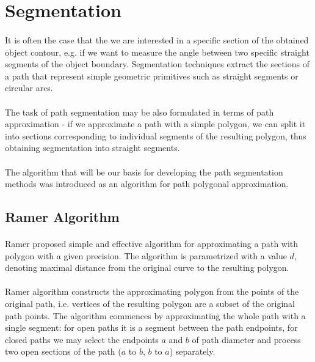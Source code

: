 \section{Segmentation}

\paragraph*{}
It is often the case that the we are interested in a specific section of the obtained object contour, e.g. if we want to measure the angle between two specific straight segments of the object boundary. Segmentation techniques extract the sections of a path that represent simple geometric primitives such as straight segments or circular arcs.

\paragraph*{}
The task of path segmentation may be also formulated in terms of path approximation - if we approximate a path with a simple polygon, we can split it into sections corresponding to individual segments of the resulting polygon, thus obtaining segmentation into straight segments.

\paragraph*{}
The algorithm that will be our basis for developing the path segmentation methods was introduced as an algorithm for path polygonal approximation.

\subsection{Ramer Algorithm}

\paragraph*{}
Ramer proposed\cite{Ramer72} simple and effective algorithm for approximating a path with polygon with a given precision. The algorithm is parametrized with a value $d$, denoting maximal distance from the original curve to the resulting polygon.

\paragraph*{}
Ramer algorithm constructs the approximating polygon from the points of the original path, i.e. vertices of the resulting polygon are a subset of the original path points. The algorithm commences by approximating the whole path with a single segment: for open paths it is a segment between the path endpoints, for closed paths we may select the endpoints $a$ and $b$ of path diameter and process two open sections of the path ($a$ to $b$, $b$ to $a$) separately.

